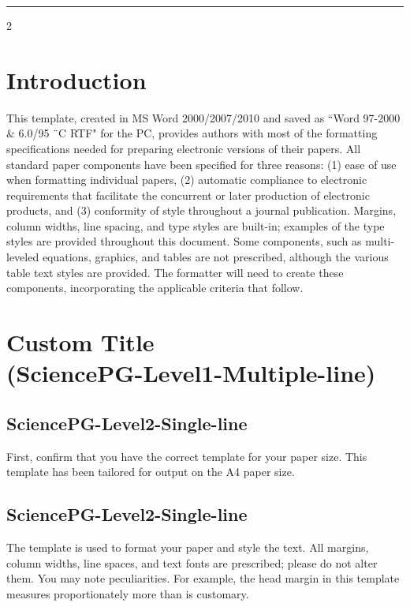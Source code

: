 ﻿\documentclass{book}
\theoremstyle{remark}
\begin{document}
\noindent \rule{\textwidth}{1pt}
\parskip=0pt
\columnseprule=0pt
\setlength{\columnsep}{1.5em}
\vspace{-12pt}
\begin{multicols}{2}
\section{Introduction}
\vspace{-6pt}
This template, created in MS Word 2000/2007/2010 and saved as ``Word 97-2000 \& 6.0/95 ¨C RTF" for the PC, provides authors with most of the formatting specifications needed for preparing electronic versions of their papers. All standard paper components have been specified for three reasons: (1) ease of use when formatting individual papers, (2) automatic compliance to electronic requirements that facilitate the concurrent or later production of electronic products, and (3) conformity of style throughout a journal publication. Margins, column widths, line spacing, and type styles are built-in; examples of the type styles are provided throughout this document. Some components, such as multi-leveled equations, graphics, and tables are not prescribed, although the various table text styles are provided. The formatter will need to create these components, incorporating the applicable criteria that follow.

\section{Custom Title\\(SciencePG-Level1-Multiple-line)}

\subsection{SciencePG-Level2-Single-line}
First, confirm that you have the correct template for your paper size. This template has been tailored for output on the A4 paper size.

\subsection{SciencePG-Level2-Single-line}
The template is used to format your paper and style the text. All margins, column widths, line spaces, and text fonts are prescribed; please do not alter them. You may note peculiarities. For example, the head margin in this template measures proportionately more than is customary.


\end{multicols}
\end{document}
